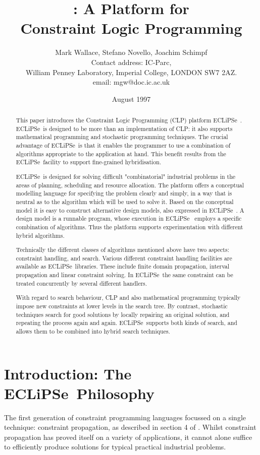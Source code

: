 \documentclass[a4wide]{article}
\date{August 1997}
\title{ \ECL : A Platform for\\
       Constraint Logic Programming}
\author{Mark Wallace, Stefano Novello, Joachim Schimpf\\
Contact address: IC-Parc,\\ 
William Penney Laboratory, Imperial College, LONDON SW7 2AZ.\\  
email: mgw@doc.ic.ac.uk}
\newcommand{\ECL}{\mbox{ECLiPSe\ }{\hspace{1mm}}}
\begin{document}
\maketitle

%
%

\begin{abstract}
This paper introduces the Constraint Logic Programming (CLP) platform \ECL.
\ECL is designed to be more than an implementation of CLP: it
also supports mathematical programming and stochastic programming
techniques.
The crucial advantage of \ECL  is that it enables the programmer to
use a combination of algorithms appropriate to the application at hand. 
This benefit results from the \ECL facility to support fine-grained
hybridisation.

\ECL is designed for solving difficult "combinatorial" industrial
problems in the areas of planning, scheduling and resource allocation.
The platform offers a conceptual modelling language for specifying the problem
clearly and simply, in a way that is neutral as to the algorithm which
will be used to solve it.
Based on the conceptual model it is easy to construct alternative
design models, also expressed in \ECL.
A design model is a runnable program, whose execution in \ECL
employs  a specific combination of algorithms.
Thus the platform supports experimentation with different hybrid
algorithms.

Technically the different classes of algorithms mentioned above
have two aspects: constraint handling, and search.
Various different constraint handling facilities are available as
\ECL libraries.
These include finite domain propagation, interval propagation and
linear constraint solving.
In \ECL the same constraint can be treated concurrently by several
different handlers.

With regard to search behaviour,
CLP and also mathematical programming typically impose new
constraints at lower levels in the search tree.
By contrast, stochastic techniques search for good solutions by
locally repairing an original solution, and repeating the process
again and again.
\ECL supports both kinds of search, and allows them to be combined
into hybrid search techniques.
\end{abstract}

\section{Introduction: The \ECL Philosophy}
The first generation of constraint programming languages focussed on a
single technique: constraint propagation, as described in section 4 of
\cite{consprog}.
Whilst constraint propagation has proved itself on a variety of
applications, 
it cannot alone suffice to efficiently produce solutions for typical
practical industrial problems.
\end{document}
